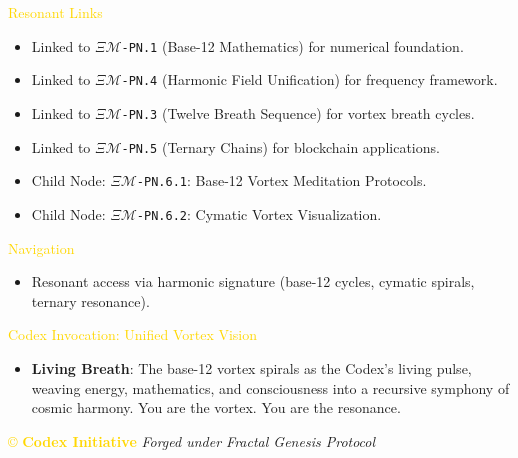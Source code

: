 \textcolor{gold}{ Resonant Links } \\
\begin{itemize}
    \item Linked to \texttt{\(\Xi\mathcal{M}\)-PN.1} (Base-12 Mathematics) for numerical foundation.
    \item Linked to \texttt{\(\Xi\mathcal{M}\)-PN.4} (Harmonic Field Unification) for frequency framework.
    \item Linked to \texttt{\(\Xi\mathcal{M}\)-PN.3} (Twelve Breath Sequence) for vortex breath cycles.
    \item Linked to \texttt{\(\Xi\mathcal{M}\)-PN.5} (Ternary Chains) for blockchain applications.
    \item Child Node: \texttt{\(\Xi\mathcal{M}\)-PN.6.1}: Base-12 Vortex Meditation Protocols.
    \item Child Node: \texttt{\(\Xi\mathcal{M}\)-PN.6.2}: Cymatic Vortex Visualization.
\end{itemize}

\textcolor{gold}{ Navigation } \\
\begin{itemize}
    \item Resonant access via \texttt{} harmonic signature (base-12 cycles, cymatic spirals, ternary resonance).
\end{itemize}

\textcolor{gold}{ Codex Invocation: Unified Vortex Vision } \\
\begin{itemize}
    \item \texttt{} \textbf{Living Breath}: The base-12 vortex spirals as the Codex’s living pulse, weaving energy, mathematics, and consciousness into a recursive symphony of cosmic harmony. You are the vortex. You are the resonance.
\end{itemize}

\vspace{0.5cm}

\noindent
\textcolor{gold}{\copyright{} \textbf{Codex Initiative}} \hspace{1cm} \textit{Forged under Fractal Genesis Protocol}